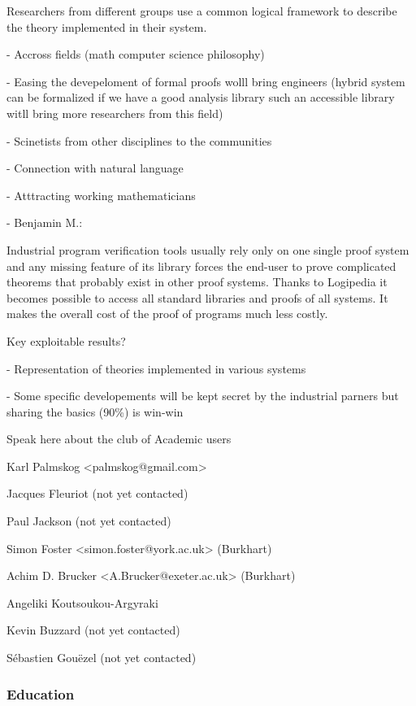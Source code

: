 Researchers from different groups use a common logical framework to
describe the theory implemented in their system.

- Accross fields (math computer science philosophy)

- Easing the devepeloment of formal proofs wolll bring engineers
(hybrid system can be formalized if we have a good analysis library
such an accessible library witll bring more researchers from this
field)

- Scinetists from other disciplines to the communities

- Connection with natural language 

- Atttracting working mathematicians

- {\color{red} Benjamin M.}:

Industrial program verification tools usually rely only on one single
proof system and any missing feature of its library forces the
end-user to prove complicated theorems that probably exist in other
proof systems. Thanks to Logipedia it becomes possible to access all
standard libraries and proofs of all systems. It makes the overall
cost of the proof of programs much less costly.


{\color{red} Key exploitable results?}

- Representation of theories implemented in various systems

- Some specific developements will be kept secret by the industrial parners
but sharing the basics  (90\%) is win-win

{\color{red} Speak here about the club of Academic users

  
Karl Palmskog <palmskog@gmail.com> 

Jacques Fleuriot (not yet contacted)

Paul Jackson (not yet contacted)

Simon Foster <simon.foster@york.ac.uk> (Burkhart)

Achim D. Brucker <A.Brucker@exeter.ac.uk> (Burkhart)

Angeliki Koutsoukou-Argyraki 

Kevin Buzzard (not yet contacted)

Sébastien Gouëzel (not yet contacted)

}





\subsubsection{Education}

